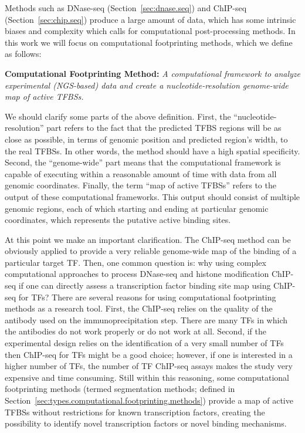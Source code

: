 Methods such as DNase-seq (Section~\ref{sec:dnase.seq}) and ChIP-seq (Section~\ref{sec:chip.seq}) produce a large amount of data, which has some intrinsic biases and complexity which calls for computational post-processing methods. In this work we will focus on computational footprinting methods, which we define as follows:

\vspace{0.5cm}
\noindent
\textbf{Computational Footprinting Method:} \emph{A computational framework to analyze experimental (NGS-based) data and create a nucleotide-resolution genome-wide map of active TFBSs.}
\vspace{0.45cm}

We should clarify some parts of the above definition. First, the ``nucleotide-resolution'' part refers to the fact that the predicted TFBS regions will be as close as possible, in terms of genomic position and predicted region's width, to the real TFBSs. In other words, the method should have a high spatial specificity. Second, the ``genome-wide'' part means that the computational framework is capable of executing within a reasonable amount of time with data from all genomic coordinates. Finally, the term ``map of active TFBSs'' refers to the output of these computational frameworks. This output should consist of multiple genomic regions, each of which starting and ending at particular genomic coordinates, which represents the putative active binding sites.

At this point we make an important clarification. The ChIP-seq method can be obviously applied to provide a very reliable genome-wide map of the binding of a particular target TF. Then, one common question is: why using complex computational approaches to process DNase-seq and histone modification ChIP-seq if one can directly assess a transcription factor binding site map using ChIP-seq for TFs? There are several reasons for using computational footprinting methods as a research tool. First, the ChIP-seq relies on the quality of the antibody used on the immunoprecipitation step. There are many TFs in which the antibodies do not work properly or do not work at all. Second, if the experimental design relies on the identification of a very small number of TFs then ChIP-seq for TFs might be a good choice; however, if one is interested in a higher number of TFs, the number of TF ChIP-seq assays makes the study very expensive and time consuming. Still within this reasoning, some computational footprinting methods (termed segmentation methods; defined in Section~\ref{sec:types.computational.footprinting.methods}) provide a map of active TFBSs without restrictions for known transcription factors, creating the possibility to identify novel transcription factors or novel binding mechanisms.

